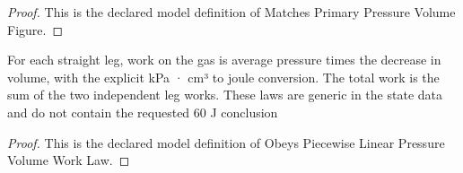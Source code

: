 \begin{proof}
  This is the declared model definition of Matches Primary Pressure Volume Figure.
\end{proof}
\begin{definition}
  \label{def:physics:phyx-mini-0402:phyxminiproblems-problemphyxmini0402-obeyspiecewiselinearpressurevolumeworklaw}
  For each straight leg, work on the gas is average pressure times the decrease in volume, with the explicit kPa · cm³ to joule conversion. The total work is the sum of the two independent leg works. These laws are generic in the state data and do not contain the requested 60 J conclusion
\end{definition}
\begin{proof}
  This is the declared model definition of Obeys Piecewise Linear Pressure Volume Work Law.
\end{proof}
